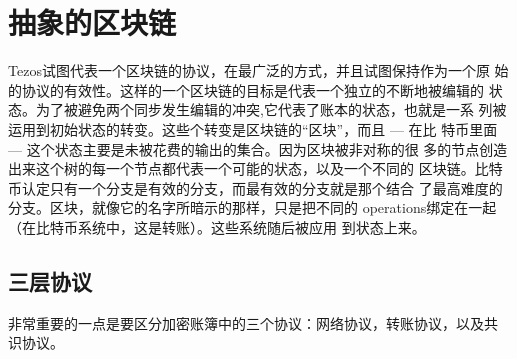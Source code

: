 \documentclass[letterpaper]{article}
\begin{document}
\section{抽象的区块链}

Tezos试图代表一个区块链的协议，在最广泛的方式，并且试图保持作为一个原
始的协议的有效性。这样的一个区块链的目标是代表一个独立的不断地被编辑的
状态。为了被避免两个同步发生编辑的冲突,它代表了账本的状态，也就是一系
列被运用到初始状态的转变。这些个转变是区块链的``区块''，而且 --- 在比
特币里面 --- 这个状态主要是未被花费的输出的集合。因为区块被非对称的很
多的节点创造出来这个树的每一个节点都代表一个可能的状态，以及一个不同的
区块链。比特币认定只有一个分支是有效的分支，而最有效的分支就是那个结合
了最高难度的分支。区块，就像它的名字所暗示的那样，只是把不同的
operations绑定在一起 （在比特币系统中，这是转账）。这些系统随后被应用
到状态上来。

\subsection{三层协议}

非常重要的一点是要区分加密账簿中的三个协议：网络协议，转账协议，以及共
识协议。
\end{document}
